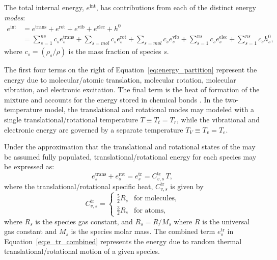 \documentclass[10pt]{article}
\newcommand{\elec}{\text{elec}}
\begin{document}
The total internal energy, $e^{\text{int}}$, has contributions from each of the distinct energy \emph{modes}:%
\begin{equation}
 \begin{split}
e^{\text{int}} &= e^{\text{trans}} + e^{\text{rot}} + e^{\text{vib}} + e^{\elec} + h^0 \\
 &= \sum_{s=1}^{ns} c_s e^{\text{trans}}_s + \sum_{s=mol} c_s e^{\text{rot}}_s + \sum_{s=mol} c_s e^{\text{vib}}_s + \sum_{s=1}^{ns} c_s e^{\elec}_s + \sum_{s=1}^{ns} c_s h^0_s ,
\label{eq:energy_partition}  
 \end{split}
\end{equation}
where $c_s=\left(\rho_s/\rho\right)$ is the mass fraction of species $s$.

The first four terms on the right of Equation~\eqref{eq:energy_partition} represent the energy due to molecular/atomic translation, molecular rotation, molecular vibration, and electronic excitation. The final term is the heat of formation of the mixture and accounts for the energy stored in chemical bonds \citep{Ait1996,Kirk2009}. In the two-temperature model, the translational and rotational modes may modeled with a single translational/rotational temperature $T\equiv T_t = T_r$, while the vibrational and electronic energy are governed by a separate temperature $T_V \equiv T_v=T_e$. 
 
Under the approximation that the translational and rotational states of the may be assumed fully populated, translational/rotational energy for each species may be expressed as:
\begin{equation}
 \label{eq:e_tr_combined}
 e^{\text{trans}}_s + e^{\text{rot}}_s = e^{\text{tr}}_s = C^{\text{tr}}_{v,s}\, T ,
\end{equation}
where the translational/rotational specific heat, $C^{\text{tr}}_{v,s}$ is given by
\begin{equation*}
 C^{\text{tr}}_{v,s} =
 \begin{cases}
 \frac{5}{2} R_s & \text{for molecules}, \\
 \frac{3}{2} R_s & \text{for atoms},
 \end{cases}
\end{equation*}
where $R_s$ is the species gas constant, and $R_s = R/M_s$ where $R$ is the universal gas constant and $M_s$ is the species molar mass. The combined term $e^{\text{tr}}_s$ in Equation~\eqref{eq:e_tr_combined} represents the energy due to random thermal translational/rotational motion of a given species.
\end{document}
